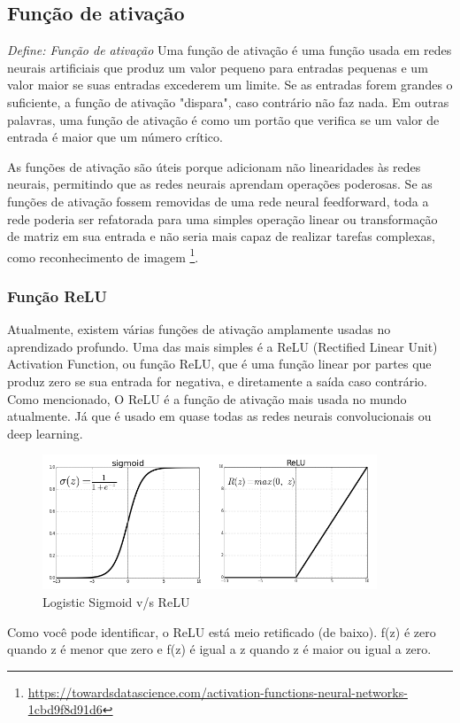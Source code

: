 \subsection[Função de ativação]{Função de ativação}

\textit{Define: Função de ativação} Uma função de ativação é uma função usada em redes neurais artificiais que produz um valor pequeno para entradas pequenas e um valor maior se suas entradas excederem um limite. Se as entradas forem grandes o suficiente, a função de ativação "dispara", caso contrário não faz nada. Em outras palavras, uma função de ativação é como um portão que verifica se um valor de entrada é maior que um número crítico.

As funções de ativação são úteis porque adicionam não linearidades às redes neurais, permitindo que as redes neurais aprendam operações poderosas. Se as funções de ativação fossem removidas de uma rede neural feedforward, toda a rede poderia ser refatorada para uma simples operação linear ou transformação de matriz em sua entrada e não seria mais capaz de realizar tarefas complexas, como reconhecimento de imagem \footnote{\url{https://towardsdatascience.com/activation-functions-neural-networks-1cbd9f8d91d6}}.

\subsubsection[Função ReLU]{Função ReLU}
Atualmente, existem várias funções de ativação amplamente usadas no aprendizado profundo. Uma das mais simples é a ReLU (Rectified Linear Unit) Activation Function, ou função ReLU, que é uma função linear por partes que produz zero se sua entrada for negativa, e diretamente a saída caso contrário.
Como mencionado, O ReLU é a função de ativação mais usada no mundo atualmente. Já que é usado em quase todas as redes neurais convolucionais ou deep learning.

\begin{figure}[H]
   \begin{center}
      \includegraphics[width=10cm]{img/relu.png}
      \caption{Logistic Sigmoid v/s ReLU} \label{relu}
   \end{center}
\end{figure}
Como você pode identificar, o ReLU está meio retificado (de baixo). f(z) é zero quando z é menor que zero e f(z) é igual a z quando z é maior ou igual a zero.

